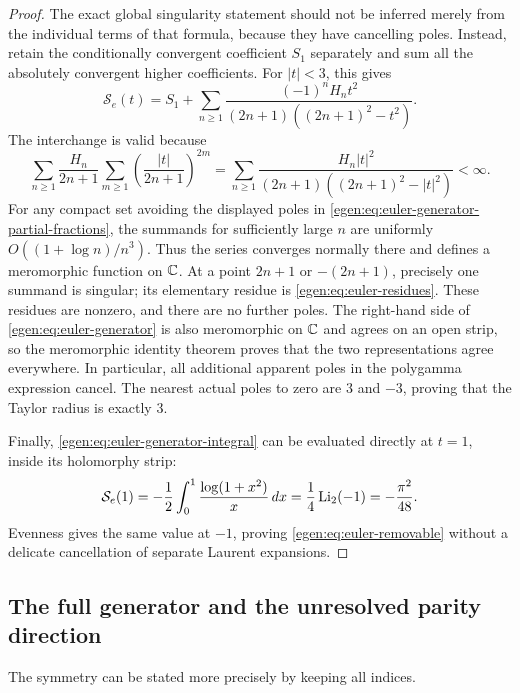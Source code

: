 \begin{proof}
The exact global singularity statement should not be inferred merely
from the individual terms of that formula, because they have cancelling
poles. Instead, retain the conditionally convergent coefficient
\(S_1\) separately and sum all the absolutely convergent higher
coefficients. For \(|t|<3\), this gives
\begin{equation}
\mathcal S_e(t)=S_1+\sum_{n\ge1}
 \frac{(-1)^nH_n t^2}
 {(2n+1)((2n+1)^2-t^2)}.
\label{egen:eq:euler-generator-partial-fractions}
\end{equation}
The interchange is valid because
\[
\sum_{n\ge1}\frac{H_n}{2n+1}
 \sum_{m\ge1}\left(\frac{|t|}{2n+1}\right)^{2m}
=\sum_{n\ge1}
 \frac{H_n|t|^2}{(2n+1)((2n+1)^2-|t|^2)}<\infty.
\]
For any compact set avoiding the displayed poles in
\eqref{egen:eq:euler-generator-partial-fractions}, the summands for
sufficiently large \(n\) are uniformly
\(O((1+\log n)/n^3)\). Thus the series converges normally there
and defines a meromorphic function on \(\mathbb C\). At a point
\(2n+1\) or \(-(2n+1)\), precisely one summand is singular;
its elementary residue is \eqref{egen:eq:euler-residues}. These
residues are nonzero, and there are no further poles. The right-hand
side of \eqref{egen:eq:euler-generator} is also meromorphic on \(\mathbb C\)
and agrees on an open strip, so the meromorphic identity theorem
proves that the two representations agree everywhere. In particular,
all additional apparent poles in the polygamma expression cancel.
The nearest actual poles to zero are \(3\) and \(-3\), proving
that the Taylor radius is exactly \(3\).

Finally, \eqref{egen:eq:euler-generator-integral} can be evaluated directly
at \(t=1\), inside its holomorphy strip:
\[
\mathcal S_e(1)=-\frac12\int_0^1\frac{\log(1+x^2)}{x}\,dx
     =\frac14\operatorname{Li}_2(-1)=-\frac{\pi^2}{48}.
\]
Evenness gives the same value at \(-1\), proving
\eqref{egen:eq:euler-removable} without a delicate cancellation of
separate Laurent expansions.
\end{proof}

\subsection{The full generator and the unresolved parity direction}

The symmetry can be stated more precisely by keeping all indices.

